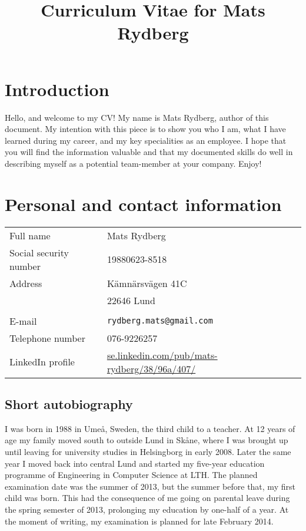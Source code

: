 \documentclass[a4paper]{article}
\title{\huge{Curriculum Vitae for Mats Rydberg}}
\date{}
\newcommand{\code}{\texttt}
\begin{document}
\maketitle

\section*{Introduction}
Hello, and welcome to my CV! My name is Mats Rydberg, author of this document. My intention with this piece is to show you who I am, what I have learned during my career, and my key specialities as an employee. I hope that you will find the information valuable and that my documented skills do well in describing myself as a potential team-member at your company. Enjoy!

\section*{Personal and contact information}
\begin{tabular}{ll}

Full name & Mats Rydberg \\
Social security number & 19880623-8518 \\
Address & Kämnärsvägen 41C \\
& 22646 Lund \\
&  \\
E-mail & \code{rydberg.mats@gmail.com} \\
Telephone number & 076-9226257 \\
LinkedIn profile & \url{se.linkedin.com/pub/mats-rydberg/38/96a/407/} \\

\end{tabular}



\subsection*{Short autobiography}
I was born in 1988 in Umeå, Sweden, the third child to a teacher. At 12 years of age my family moved south to outside Lund in Skåne, where I was brought up until leaving for university studies in Helsingborg in early 2008. Later the same year I moved back into central Lund and started my five-year education programme of Engineering in Computer Science at LTH. The planned examination date was the summer of 2013, but the summer before that, my first child was born. This had the consequence of me going on parental leave during the spring semester of 2013, prolonging my education by one-half of a year. At the moment of writing, my examination is planned for late February 2014.
\end{document}
